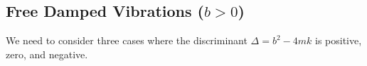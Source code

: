 \subsection{Free Damped Vibrations ($b > 0$)}
We need to consider three cases where the discriminant $\Delta = b^2 - 4mk$ is positive, zero, and negative. 





